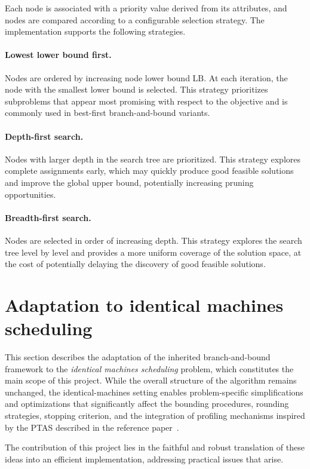 Each node is associated with a priority value derived from its attributes, and nodes are compared according to a configurable selection strategy.
The implementation supports the following strategies.

\paragraph{Lowest lower bound first.}
Nodes are ordered by increasing node lower bound \(\text{LB}\).
At each iteration, the node with the smallest lower bound is selected.
This strategy prioritizes subproblems that appear most promising with respect to the objective and is commonly used in best-first branch-and-bound variants.

\paragraph{Depth-first search.}
Nodes with larger depth in the search tree are prioritized.
This strategy explores complete assignments early, which may quickly produce good feasible solutions and improve the global upper bound, potentially increasing pruning opportunities.

\paragraph{Breadth-first search.}
Nodes are selected in order of increasing depth.
This strategy explores the search tree level by level and provides a more uniform coverage of the solution space, at the cost of potentially delaying the discovery of good feasible solutions.

\section{Adaptation to identical machines scheduling}
\label{sec:bb-identical}

This section describes the adaptation of the inherited branch-and-bound framework to the \emph{identical machines scheduling} problem, which constitutes the main scope of this project.
While the overall structure of the algorithm remains unchanged, the identical-machines setting enables problem-specific simplifications and optimizations that significantly affect the
bounding procedures, rounding strategies, stopping criterion, and the integration of profiling mechanisms inspired by the PTAS described in the reference paper~\cite{bb-ptas}.

The contribution of this project lies in the faithful and robust translation of these ideas into an efficient implementation, addressing practical issues that arise.

